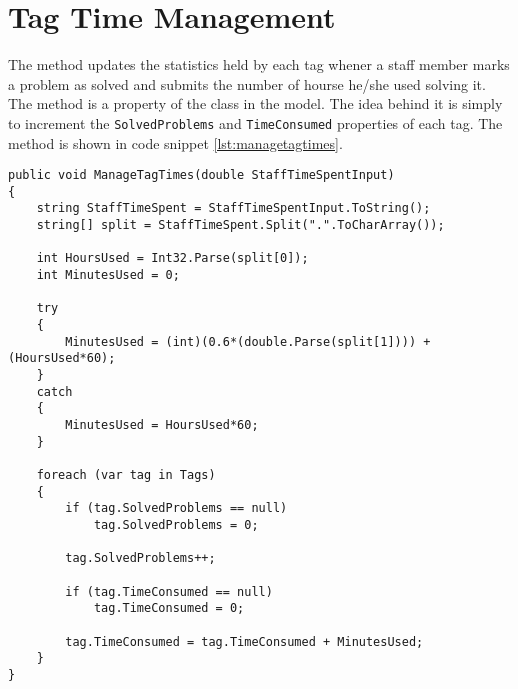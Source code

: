 \section{Tag Time Management}
\label{sec:managetagtimes}

The  method updates the statistics held by each tag whener a staff member marks a problem as solved and submits the number of hourse he/she used solving it. The  method is a property of the  class in the model.
The idea behind it is simply to increment the \verb+SolvedProblems+ and \verb+TimeConsumed+ properties of each tag. The method is shown in code snippet \ref{lst:managetagtimes}.

\begin{lstlisting}[style=sourceCode, caption=\myCaption{The ManageTagTimes method}, label=lst:managetagtimes]
public void ManageTagTimes(double StaffTimeSpentInput)
{
    string StaffTimeSpent = StaffTimeSpentInput.ToString();
    string[] split = StaffTimeSpent.Split(".".ToCharArray());
    
    int HoursUsed = Int32.Parse(split[0]);
    int MinutesUsed = 0;

    try
    {
        MinutesUsed = (int)(0.6*(double.Parse(split[1]))) + (HoursUsed*60);
    }
    catch
    {
        MinutesUsed = HoursUsed*60;
    }

    foreach (var tag in Tags)
    {
        if (tag.SolvedProblems == null)
            tag.SolvedProblems = 0;
        
        tag.SolvedProblems++;

        if (tag.TimeConsumed == null)
            tag.TimeConsumed = 0;

        tag.TimeConsumed = tag.TimeConsumed + MinutesUsed;
    }
}
\end{lstlisting}